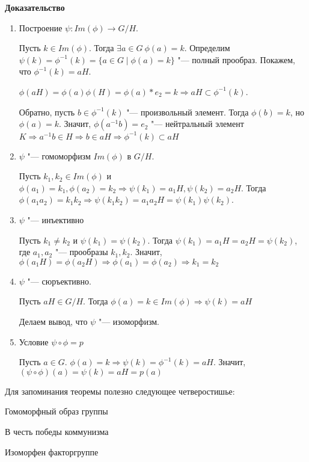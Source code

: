 \documentclass{article}
\begin{document}
\vspace{5pt}

\textbf{Доказательство}

\begin{enumerate}
	\item Построение $\psi: Im(\phi) \rightarrow G/H$.
	
	Пусть $k \in Im(\phi)$. Тогда $\exists a \in G \  \phi(a) = k$. Определим $\psi(k) = \phi^{-1}(k) = \{a \in G \mid \phi(a) = k\}$ "--- полный прообраз.
	Покажем, что $\phi^{-1}(k) = aH$.
	
	$\phi(aH) = \phi(a)\phi(H) = \phi(a)*e_2 = k \Rightarrow aH \subset \phi^{-1}(k)$.
	
	Обратно, пусть $b \in \phi^{-1}(k)$ "--- произвольный элемент. Тогда $\phi(b) = k$, но $\phi(a) = k$. Значит, $\phi(a^{-1}b) = e_2$ "--- нейтральный элемент $K \Rightarrow a^{-1}b \in H \Rightarrow b \in aH \Rightarrow \phi^{-1}(k) \subset aH$
	\item $\psi$ "--- гомоморфизм $Im(\phi)$ в $G/H$.
	
	Пусть $k_1, k_2 \in Im(\phi)$ и $\phi(a_1) = k_1, \phi(a_2) = k_2 \Rightarrow \psi(k_1) = a_1H, \psi(k_2) = a_2H$. Тогда $\phi(a_1a_2) = k_1k_2 \Rightarrow \psi(k_1k_2) = a_1a_2H = \psi(k_1)\psi(k_2)$.
	\item $\psi$ "--- инъективно
	
	Пусть $k_1 \neq k_2$ и $\psi(k_1) = \psi(k_2)$. Тогда $\psi(k_1) = a_1H = a_2H = \psi(k_2)$, где $a_1, a_2$ "--- прообразы $k_1, k_2$. Значит, $\phi(a_1H) = \phi(a_2H) \Rightarrow \phi(a_1) = \phi(a_2) \Rightarrow k_1 = k_2$
	\item $\psi$ "--- сюръективно.
	
	Пусть $aH \in G/H$. Тогда $\phi(a) = k \in Im(\phi) \Rightarrow \psi(k) = aH$
	
	Делаем вывод, что $\psi$ "--- изоморфизм.
	\item Условие $\psi \circ \phi = p$
	
	Пусть $a \in G$. $\phi(a) = k \Rightarrow \psi(k) = \phi^{-1}(k) = aH$. Значит, $(\psi \circ \phi)(a) = \psi(k) = aH = p(a)$
\end{enumerate}

\vspace{10pt}

Для запоминания теоремы полезно следующее четверостишье:

Гомоморфный образ группы

В честь победы коммунизма

Изоморфен факторгруппе
\end{document}
